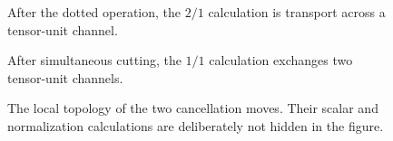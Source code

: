 \documentclass[11pt]{article}
\begin{document}
\begin{figure}[ht]
  \centering
  \caption{After the dotted operation, the $2/1$ calculation is transport
  across a tensor-unit channel.}
\end{figure}

\clearpage
\begin{figure}[ht]
  \centering
  \caption{After simultaneous cutting, the $1/1$ calculation exchanges two
  tensor-unit channels.}
\end{figure}

\begin{figure}[ht]
  \centering
  \caption{The local topology of the two cancellation moves.  Their scalar
  and normalization calculations are deliberately not hidden in the figure.}
\end{figure}
\end{document}
